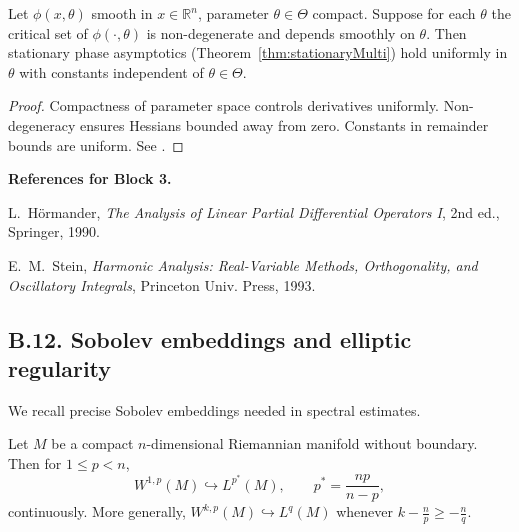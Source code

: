 \begin{theorem}
\label{thm:stationaryParam}
Let $\phi(x,\theta)$ smooth in $x\in\mathbb{R}^n$, parameter $\theta\in \Theta$ compact. Suppose for each $\theta$ the critical set of $\phi(\cdot,\theta)$ is non-degenerate and depends smoothly on $\theta$. Then stationary phase asymptotics (Theorem~\ref{thm:stationaryMulti}) hold uniformly in $\theta$ with constants independent of $\theta\in\Theta$.
\end{theorem}

\begin{proof}
Compactness of parameter space controls derivatives uniformly. Non-degeneracy ensures Hessians bounded away from zero. Constants in remainder bounds are uniform. See \cite[Thm.~7.7.5]{HormanderVolI}.
\end{proof}

\medskip

\noindent\textbf{References for Block 3.}
\begin{thebibliography}{99}

L.~Hörmander, \emph{The Analysis of Linear Partial Differential Operators I}, 2nd ed., Springer, 1990.

E.~M.~Stein, \emph{Harmonic Analysis: Real-Variable Methods, Orthogonality, and Oscillatory Integrals}, Princeton Univ. Press, 1993.

\end{thebibliography}


\subsection*{B.12. Sobolev embeddings and elliptic regularity}
\label{appB:sobolev}

We recall precise Sobolev embeddings needed in spectral estimates.

\begin{theorem}
\label{thm:sobolevEmbed}
Let $M$ be a compact $n$-dimensional Riemannian manifold without boundary. Then for $1\le p < n$,
\[
W^{1,p}(M) \hookrightarrow L^{p^*}(M),\qquad p^* = \frac{np}{n-p},
\]
continuously. More generally, $W^{k,p}(M)\hookrightarrow L^q(M)$ whenever $k - \frac{n}{p} \ge -\frac{n}{q}$.
\end{theorem}


